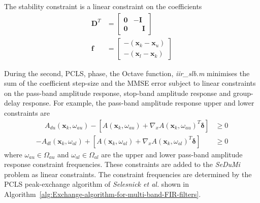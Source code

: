 \documentclass[a4paper,twoside,10pt,english]{report}
\begin{document}
The stability constraint is a linear constraint on the coefficients
\begin{align*}
\boldsymbol{D}^{T} &= \left[\begin{array}{cc} \boldsymbol{0} & \boldsymbol{-I}\\
\boldsymbol{0} & \boldsymbol{\phantom{-}I} \end{array}\right] \\
\boldsymbol{f} &= \left[\begin{array}{c}
-\left(\boldsymbol{x}_{k}-\boldsymbol{x}_{u}\right) \\
-\left(\boldsymbol{x}_{l}-\boldsymbol{x}_{k}\right)\end{array}\right]
\end{align*}

During the second, PCLS, phase, the Octave function, \emph{iir\_slb.m}
minimises the sum of the coefficient step-size and the MMSE error subject to
linear constraints on the pass-band amplitude response, stop-band amplitude
response and group-delay response. For example, the pass-band amplitude
response upper and lower constraints are
\begin{align*}
\mathbin{\phantom{-}}A_{du}\left(\boldsymbol{x}_{k},\omega_{au}\right) 
- \left[A\left(\boldsymbol{x}_{k},\omega_{au}\right) + 
\nabla_{x}A\left(\boldsymbol{x}_{k},\omega_{au}\right)^{T}
\boldsymbol{\delta}\right]&\ge 0\\
-A_{dl}\left(\boldsymbol{x}_{k},\omega_{al}\right) + 
\left[A\left(\boldsymbol{x}_{k},\omega_{al}\right) + 
\nabla_{x} A\left(\boldsymbol{x}_{k},\omega_{al}\right)^{T}
\boldsymbol{\delta}\right]&\ge 0
\end{align*}
where $\omega_{au}\in\Omega_{au}$ and $\omega_{al}\in\Omega_{al}$ are the upper
and lower pass-band amplitude response constraint frequencies. These constraints
are added to the \emph{SeDuMi} problem as linear constraints. The constraint
frequencies are determined by the PCLS peak-exchange algorithm of 
\emph{Selesnick et al.} shown in
Algorithm~\ref{alg:Exchange-algorithm-for-multi-band-FIR-filters}.
\end{document}
